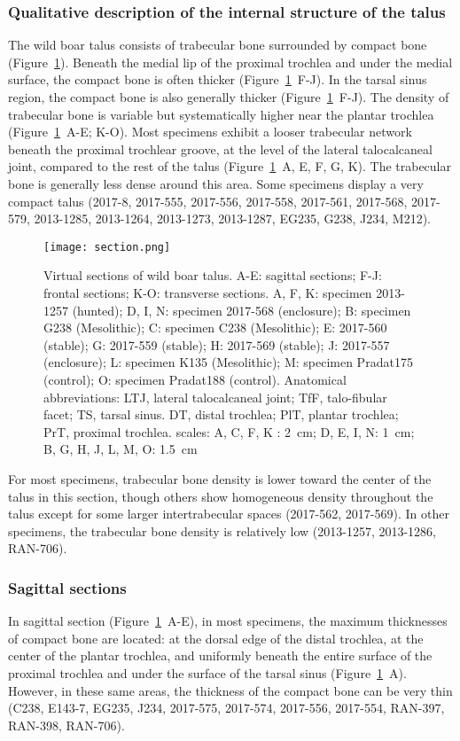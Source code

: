 \documentclass[12pt,a4paper]{article}
\begin{document}
\subsubsection{Qualitative description of the internal structure of the talus}
The wild boar talus consists of trabecular bone surrounded by compact bone (Figure~\ref{section}). Beneath the medial lip of the proximal trochlea and under the medial surface, the compact bone is often thicker (Figure~\ref{section}~F-J). In the tarsal sinus region, the compact bone is also generally thicker (Figure~\ref{section}~F-J). The density of trabecular bone is variable but systematically higher near the plantar trochlea (Figure~\ref{section}~A-E; K-O). Most specimens exhibit a looser trabecular network beneath the proximal trochlear groove, at the level of the lateral talocalcaneal joint, compared to the rest of the talus (Figure~\ref{section}~A, E, F, G, K). The trabecular bone is generally less dense around this area. Some specimens display a very compact talus (2017-8, 2017-555, 2017-556, 2017-558, 2017-561, 2017-568, 2017-579, 2013-1285, 2013-1264, 2013-1273, 2013-1287, EG235, G238, J234, M212). 
\begin{figure}[H]
	\texttt{[image: section.png]}
	\caption{Virtual sections of wild boar talus. 
	A-E: sagittal sections; F-J: frontal sections; K-O: transverse sections. A, F, K: specimen 2013-1257 (hunted); D, I, N: specimen 2017-568 (enclosure); B: specimen G238 (Mesolithic); C: specimen C238 (Mesolithic); E: 2017-560 (stable); G: 2017-559 (stable); H: 2017-569 (stable); J: 2017-557 (enclosure); L: specimen K135 (Mesolithic); M: specimen Pradat175 (control); O: specimen Pradat188 (control). Anatomical abbreviations: LTJ, lateral talocalcaneal joint; TfF, talo-fibular facet; TS, tarsal sinus. DT, distal trochlea; PlT, plantar trochlea; PrT, proximal trochlea. scales: A, C, F, K : 2~\si{\centi\meter}; D, E, I, N: 1~\si{\centi\meter}; B, G, H, J, L, M, O: 1.5~\si{\centi\meter}}
	\label{section}
\end{figure}

For most specimens, trabecular bone density is lower toward the center of the talus in this section, though others show homogeneous density throughout the talus except for some larger intertrabecular spaces (2017-562, 2017-569). In other specimens, the trabecular bone density is relatively low (2013-1257, 2013-1286, RAN-706).
\subsubsection{Sagittal sections}
In sagittal section (Figure~\ref{section}~A-E), in most specimens, the maximum thicknesses of compact bone are located: at the dorsal edge of the distal trochlea, at the center of the plantar trochlea, and uniformly beneath the entire surface of the proximal trochlea and under the surface of the tarsal sinus (Figure~\ref{section}~A). However, in these same areas, the thickness of the compact bone can be very thin (C238, E143-7, EG235, J234, 2017-575, 2017-574, 2017-556, 2017-554, RAN-397, RAN-398, RAN-706).
\end{document}
